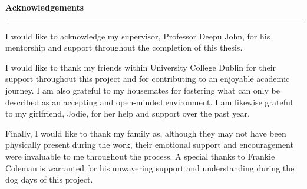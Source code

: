 
\vspace*{2cm}

\begin{center}
    {\LARGE \textbf{Acknowledgements}\par}
    \vspace{0.35cm}
    \rule{0.45\textwidth}{0.6pt}
\end{center}

\vspace{1.2cm}
\begin{doublespace}
I would like to acknowledge my supervisor, Professor Deepu John, for his mentorship and support throughout the completion of this thesis.
\vspace{1.2cm}

I would like to thank my friends within University College Dublin for their support throughout this project and for contributing to an enjoyable academic journey. I am also grateful to my housemates for fostering what can only be described as an accepting and open-minded environment. I am likewise grateful to my girlfriend, Jodie, for her help and support over the past year.

\vspace{1.2cm}

Finally, I would like to thank my family as, although they may not have been physically present during the work, their emotional support and encouragement were invaluable to me throughout the process. A special thanks to Frankie Coleman is warranted for his unwavering support and understanding during the dog days of this project.

\end{doublespace}
\vfill


